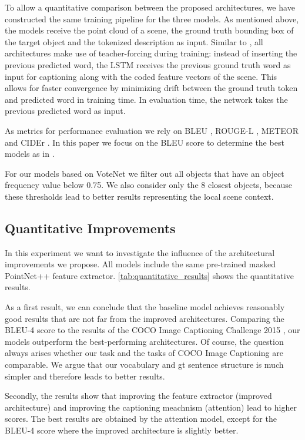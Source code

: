 \documentclass[10pt,twocolumn,letterpaper]{article}
\begin{document}
To allow a quantitative comparison between the proposed architectures, we have constructed the same training pipeline for the three models. As mentioned above, the models receive the point cloud of a scene, the ground truth bounding box of the target object and the tokenized description as input.
Similar to \cite{xu2015show}, all architectures make use of teacher-forcing during training: instead of inserting the previous predicted word, the LSTM receives the previous ground truth word as input for captioning along with the coded feature vectors of the scene.  This allows for faster convergence by minimizing drift between the ground truth token and predicted word in training time. In evaluation time, the network takes the previous predicted word as input. 

As metrics for performance evaluation we rely on BLEU \cite{Papineni2002BleuAM}, ROUGE-L \cite{Lin2004ROUGEAP}, METEOR \cite{Denkowski2014MeteorUL} and CIDEr \cite{DBLP:journals/corr/VedantamZP14a}.  In this paper we focus on the BLEU score to determine the best models as in \cite{xu2015show}. 

For our models based on VoteNet we filter out all objects that have an object frequency value below 0.75. We also consider only the 8 closest objects, because these thresholds lead to better results representing the local scene context.   

\subsection{Quantitative Improvements}
In this experiment we want to investigate the influence of the architectural improvements we propose. All models include the same pre-trained masked PointNet++ feature extractor. 
\autoref{tab:quantitative_results} shows the quantitative results. 

As a first result, we can conclude that the baseline model achieves reasonably good results that are not far from the improved architectures. Comparing the BLEU-4 score to the results of the COCO Image Captioning Challenge 2015 \cite{COCO}, our models outperform the best-performing architectures. Of course, the question always arises whether our task and the tasks of COCO Image Captioning are comparable. We argue that our vocabulary and gt sentence structure is much simpler and therefore leads to better results.

Secondly, the results show that improving the feature extractor (improved architecture) and improving the captioning meachnism (attention) lead to higher scores. The best results are obtained by the attention model, except for the BLEU-4 score where the improved architecture is slightly better.                
\end{document}
